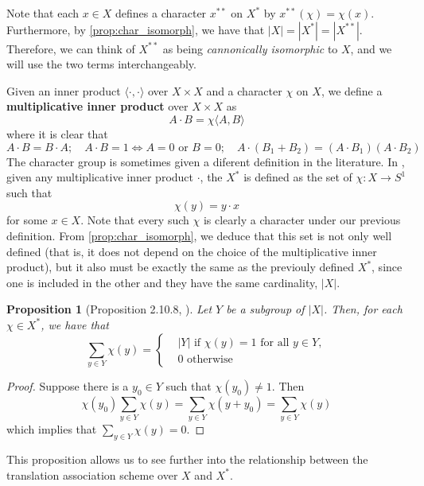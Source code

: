 \documentclass[a4paper,12pt]{article}
\theoremstyle{plain}
\newtheorem{proposition}[theorem]{Proposition}
\theoremstyle{definition}
\theoremstyle{remark}
\begin{document}
Note that each $ x \in X $ defines a character $ x^{**} $ on $ X^* $ by
$ x^{**}(\chi) = \chi(x) $. Furthermore, by \ref{prop:char_isomorph}, we have
that $ |X| = |X^*| = |X^{**}| $. Therefore, we can think of $ X^{**} $ as being
\textit{cannonically isomorphic} to $ X $, and we will use the two terms
interchangeably.

Given an inner product $ \langle \cdot,\cdot \rangle $ over $ X\times X $ and a character
$ \chi $ on $ X $, we define a \textbf{multiplicative inner product} over
$ X \times X $ as
\[ A\cdot B = \chi \langle A,B \rangle  \]
where it is clear that
\[
    A \cdot B = B \cdot A; \quad A \cdot B = 1 \iff A = 0 \text{ or } B = 0;
    \quad A \cdot (B_1 + B_2) = (A \cdot B_1)(A \cdot B_2)
\]
The character group is sometimes given a diferent definition in the literature.
In \cite{kim_duality_2011}, given any multiplicative inner product $ \cdot $,
the $ X^* $ is defined as the set of $ \chi:X \rightarrow S^1 $ such that
\[ \chi(y) = y \cdot x \]
for some $ x \in X $.
Note that every such $ \chi $ is clearly a character under our previous definition.
From \ref{prop:char_isomorph}, we deduce that this set is not only well defined
(that is, it does not depend on the choice of the multiplicative inner product),
but it also must be exactly the same as the previouly defined $ X^* $, since one
is included in the other and they have the same cardinality, $ |X| $.


\begin{proposition}[Proposition 2.10.8, \cite{brouwer_distance-regular_1989}]
    Let $ Y $ be a subgroup of $ |X| $. Then, for each $ \chi \in X^* $,
    we have that
    \begin{equation*}
        \sum_{ y \in Y } \chi (y) =
        \begin{cases}
            &| Y | \text{ if } \chi(y) = 1 \text{ for all } y \in Y, \\
            &0 \text{ otherwise}
        \end{cases}
    \end{equation*}
    \label{prop:sum_char_tas}
\end{proposition}
\begin{proof}
    Suppose there is a $ y_0 \in Y $ such that $ \chi(y_0) \neq 1 $. Then
    \[ \chi(y_0) \sum_{ y\in Y } \chi (y) =
        \sum_{ y\in Y } \chi (y+y_0) =
        \sum_{ y\in Y } \chi (y)
    \]
    which implies that $ \sum_{ y\in Y } \chi (y) = 0 $.
\end{proof}

This proposition allows us to see further into the relationship between the
translation association scheme over $ X $ and $ X^* $.
\end{document}
